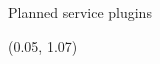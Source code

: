 \begin{frame}[t]{Planned service plugins}

    \begin{textblock*}{\textwidth}(0.05\linewidth, 1.07\textheight)
		\slidebuttons
	\end{textblock*}

\end{frame}